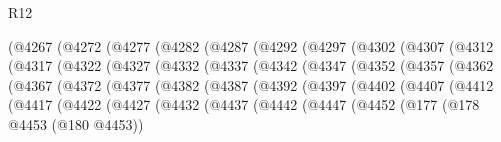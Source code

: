 \begin{lexlean}{R12}
\begin{coremodule}
{{{{{{{{{{{{{{{{{{{{{{{{{{{{{{{{{{{{{{{{{{{{{{{{{{{{{{{{{{{{{{{{{{{{{{{{{{{{{{{{{{            (@4267
              (@4272
                (@4277
                  (@4282
                    (@4287
                      (@4292
                        (@4297
                          (@4302
                            (@4307
                              (@4312
                                (@4317
                                  (@4322
                                    (@4327
                                      (@4332
                                        (@4337
                                          (@4342
                                            (@4347
                                              (@4352
                                                (@4357
                                                  (@4362
                                                    (@4367
                                                      (@4372
                                                        (@4377
                                                          (@4382
                                                            (@4387
                                                              (@4392
                                                                (@4397
                                                                  (@4402
                                                                    (@4407
                                                                      (@4412
                                                                        (@4417
                                                                          (@4422
                                                                            (@4427
                                                                              (@4432
                                                                                (@4437
                                                                                  (@4442
                                                                                    (@4447
                                                                                      (@4452
                                                                                        (@177
                                                                                          (@178
                                                                                            @4453
                                                                                            (@180
                                                                                              @4453))
}}}}}}}}}}}}}}}}}}}}}}}}}}}}}}}}}}}}}}}}}}}}}}}}}}}}}}}}}}}}}}}}}}}}}}}}}}}}}}}}}}
\end{coremodule}
\end{lexlean}
